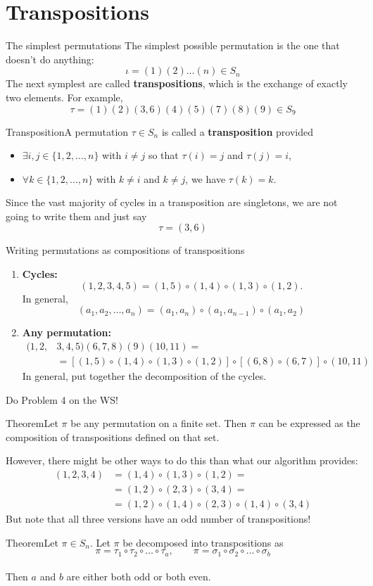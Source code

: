 \documentclass{beamer}
\def\bl[#1]#2{\begin{block}{#1}#2\end{block}}
\def\enumb{\begin{enumerate}}
\def\enume{\end{enumerate}}
\def\itemb{\begin{itemize}}
\def\iteme{\end{itemize}}
\begin{document}
\section{Transpositions}

\begin{frame}{The simplest permutations}
The simplest possible permutation is the one that doesn't do anything:
\[
\iota=(1)(2)\dots (n)\in S_n
\]
The next symplest are called \textbf{transpositions}, which is the exchange of exactly two elements. For example,
\[
\tau=(1)(2)(3,6)(4)(5)(7)(8)(9)\in S_9
\]\vspace{-0.5cm}
\bl[Transposition]{A permutation $\tau\in S_n$ is called a \textbf{transposition} provided
\itemb
\item $\exists i,j\in\{1,2,\dots,n\}$ with $i\neq j$ so that $\tau(i)=j$ and $\tau(j)=i$,
\item $\forall k\in\{1,2,\dots,n\}$ with $k\neq i$ and $k\neq j$, we have $\tau(k)=k$.
\iteme}
Since the vast majority of cycles in a transposition are singletons, we are not going to write them and just say
\[
\tau=(3,6)
\]
\end{frame}

\begin{frame}{Writing permutations as compositions of transpositions}
\enumb
\item \textbf{Cycles:}
\[
(1,2,3,4,5)=(1,5)\circ (1,4)\circ (1,3)\circ (1,2).
\]
In general,
\[
(a_1,a_2,\dots,a_n)=(a_1,a_n)\circ (a_1,a_{n-1})\circ (a_1,a_2)
\]
\item \textbf{Any permutation:}
\begin{align*}
(1,2,&3,4,5)(6,7,8)(9)(10,11)=\\
&=[(1,5)\circ (1,4)\circ (1,3) \circ (1,2)]\circ [(6,8)\circ (6,7)]\circ (10,11)
\end{align*}
In general, put together the decomposition of the cycles.\vspace{-0.2cm}
\enume
\begin{center}
Do Problem 4 on the WS!
\end{center}
\end{frame}

\begin{frame}
\bl[Theorem]{Let $\pi$ be any permutation on a finite set. Then $\pi$ can be expressed as the composition of transpositions defined on that set.}
However, there might be other ways to do this than what our algorithm provides:
\begin{align*}
(1,2,3,4)&=(1,4)\circ(1,3)\circ (1,2)=\\
&=(1,2)\circ(2,3)\circ(3,4)=\\
&=(1,2)\circ(1,4)\circ(2,3)\circ (1,4)\circ (3,4)
\end{align*}
But note that all three versions have an odd number of transpositions!
\bl[Theorem]{Let $\pi\in S_n$. Let $\pi$ be decomposed into transpositions as \vspace{-0.3cm}
\[
\pi=\tau_1\circ\tau_2\circ\dots\circ\tau_a,\qquad \pi=\sigma_1\circ\sigma_2\circ\dots\circ\sigma_b
\]\vspace{-0.8cm}\\
Then $a$ and $b$ are either both odd or both even.}
\end{frame}
\end{document}
